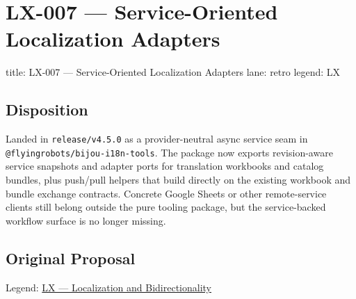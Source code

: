 \chapter{LX-007 --- Service-Oriented Localization Adapters}\label{record-360}

\smallskip

\begin{RecordMeta}
title: LX-007 — Service-Oriented Localization Adapters
lane: retro
legend: LX

\end{RecordMeta}

\section{Disposition}\label{record-360-disposition}

Landed in \texttt{r\allowbreak{}e\allowbreak{}l\allowbreak{}e\allowbreak{}a\allowbreak{}s\allowbreak{}e\allowbreak{}/\allowbreak{}v\allowbreak{}4\allowbreak{}.\allowbreak{}5\allowbreak{}.\allowbreak{}0} as a provider-neutral async service seam in \texttt{@\allowbreak{}f\allowbreak{}l\allowbreak{}y\allowbreak{}i\allowbreak{}n\allowbreak{}g\allowbreak{}r\allowbreak{}o\allowbreak{}b\allowbreak{}o\allowbreak{}t\allowbreak{}s\allowbreak{}/\allowbreak{}b\allowbreak{}i\allowbreak{}j\allowbreak{}o\allowbreak{}u\allowbreak{}-\allowbreak{}i\allowbreak{}1\allowbreak{}8\allowbreak{}n\allowbreak{}-\allowbreak{}t\allowbreak{}o\allowbreak{}o\allowbreak{}l\allowbreak{}s}. The package now exports revision-aware service snapshots and adapter ports for translation workbooks and catalog bundles, plus push/pull helpers that build directly on the existing workbook and bundle exchange contracts. Concrete Google Sheets or other remote-service clients still belong outside the pure tooling package, but the service-backed workflow surface is no longer missing.

\section{Original Proposal}\label{record-360-original-proposal}

Legend: \href{https://github.com/flyingrobots/bijou/blob/1853ad902f6bf219326409e7f743a5a1d6517dbc/docs/method/legends/LX-localization-and-bidirectionality.md}{LX --- Localization and Bidirectionality}

